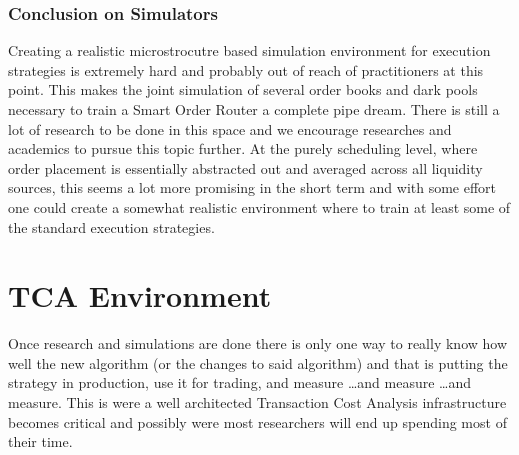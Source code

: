 \subsubsection{Conclusion on Simulators}
Creating a realistic microstrocutre based simulation environment for execution strategies is extremely hard and probably out of reach of practitioners at this point. This makes the joint simulation of several order books and dark pools necessary to train a Smart Order Router a complete pipe dream. There is still a lot of research to be done in this space and we encourage researches and academics to pursue this topic further. At the purely scheduling level, where order placement is essentially abstracted out and averaged across all liquidity sources, this seems a lot more promising in the short term and with some effort one could create a somewhat realistic environment where to train at least some of the standard execution strategies.

\section{TCA Environment}
Once research and simulations are done there is only one way to really know how well the new algorithm (or the changes to said algorithm) and that is putting the strategy in production, use it for trading, and measure \dots and measure \dots and measure. This is were a well architected Transaction Cost Analysis infrastructure becomes critical and possibly were most researchers will end up spending most of their time. 

